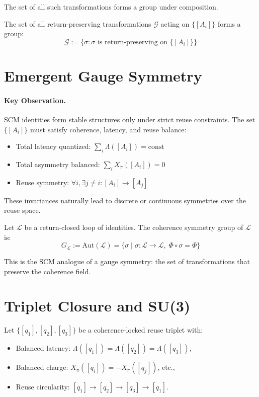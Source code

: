 The set of all such transformations forms a group under composition.

\begin{proposition}
The set of all return-preserving transformations \( \mathcal{G} \) acting on \( \{[A_i]\} \) forms a group:
\[
\mathcal{G} := \{ \sigma : \sigma \text{ is return-preserving on } \{[A_i]\} \}
\]
\end{proposition}

\section{Emergent Gauge Symmetry}

\paragraph{Key Observation.} SCM identities form stable structures only under strict reuse constraints. The set \( \{[A_i]\} \) must satisfy coherence, latency, and reuse balance:
\begin{itemize}
  \item Total latency quantized: \( \sum_i \Lambda([A_i]) = \text{const} \)
  \item Total asymmetry balanced: \( \sum_i X_\pi([A_i]) = 0 \)
  \item Reuse symmetry: \( \forall i, \exists j \ne i : [A_i] \to [A_j] \)
\end{itemize}

These invariances naturally lead to discrete or continuous symmetries over the reuse space.

\begin{definition}
Let \( \mathcal{L} \) be a return-closed loop of identities. The coherence symmetry group of \( \mathcal{L} \) is:
\[
G_\mathcal{L} := \text{Aut}(\mathcal{L}) = \{ \sigma \mid \sigma : \mathcal{L} \to \mathcal{L}, \; \Phi \circ \sigma = \Phi \}
\]
\end{definition}

This is the SCM analogue of a gauge symmetry: the set of transformations that preserve the coherence field.

\section{Triplet Closure and SU(3)}

Let \( \{[q_1], [q_2], [q_3]\} \) be a coherence-locked reuse triplet with:
\begin{itemize}
  \item Balanced latency: \( \Lambda([q_1]) = \Lambda([q_2]) = \Lambda([q_3]) \),
  \item Balanced charge: \( X_\pi([q_i]) = -X_\pi([q_j]) \), etc.,
  \item Reuse circularity: \( [q_1] \to [q_2] \to [q_3] \to [q_1] \).
\end{itemize}

